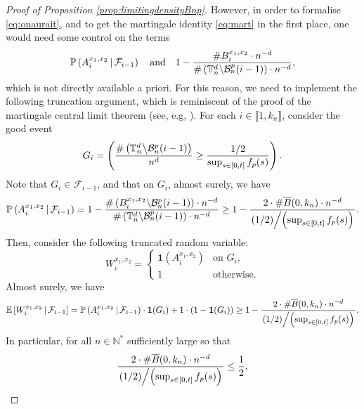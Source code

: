 \documentclass[a4paper,11pt]{article}
\begin{document}
\begin{proof}[Proof of Proposition \ref{prop:limitingdensityBnp}]
However, in order to formalise \eqref{eq:onaurait}, and to get the martingale identity \eqref{eq:mart} in the first place, one would need some control on the terms
\[\mathbb{P}\left(A_i^{x_1,x_2}\,\middle|\,\mathcal{F}_{i-1}\right)\quad\text{and}\quad1-\frac{\#B_i^{x_1,x_2}\cdot n^{-d}}{\#\left(\mathbb{T}_n^d\middle\backslash\mathcal{B}_n^p(i-1)\right)\cdot n^{-d}},\]
which is not directly available a priori.
For this reason, we need to implement the following truncation argument, which is reminiscent of the proof of the martingale central limit theorem (see, e.g, \cite[Chapter 15]{martingaleclt}).
For each $i\in\llbracket1,k_n\rrbracket$, consider the good event
\[G_i=\left(\frac{\#\left(\mathbb{T}_n^d\middle\backslash\mathcal{B}^p_n(i-1)\right)}{n^d}\geq\frac{1/2}{\sup_{s\in[0,t]}f_p(s)}\right).\]
Note that $G_i\in\mathcal{F}_{i-1}$, and that on $G_i$, almost surely, we have
\[\mathbb{P}\left(A_i^{x_1,x_2}\,\middle|\,\mathcal{F}_{i-1}\right)=1-\frac{\#\left(B_i^{x_1,x_2}\middle\backslash\mathcal{B}_n^p(i-1)\right)\cdot n^{-d}}{\#\left(\mathbb{T}_n^d\middle\backslash\mathcal{B}^p_n(i-1)\right)\cdot n^{-d}}\geq1-\frac{2\cdot\#\overline{B}(0,k_n)\cdot n^{-d}}{\left.(1/2)\middle/\left(\sup_{s\in[0,t]}f_p(s)\right)\right.}.\]
Then, consider the following truncated random variable:
\[W_i^{x_1,x_2}=\begin{cases}
\mathbf{1}\left(A_i^{x_1,x_2}\right)&\text{on $G_i$,}\\
1&\text{otherwise.}
\end{cases}\]
Almost surely, we have
\[\mathbb{E}\left[W_i^{x_1,x_2}\,\middle|\,\mathcal{F}_{i-1}\right]=\mathbb{P}\left(A_i^{x_1,x_2}\,\middle|\,\mathcal{F}_{i-1}\right)\cdot\mathbf{1}(G_i)+1\cdot(1-\mathbf{1}(G_i))\geq1-\frac{2\cdot\#\overline{B}(0,k_n)\cdot n^{-d}}{\left.(1/2)\middle/\left(\sup_{s\in[0,t]}f_p(s)\right)\right.}.\]
In particular, for all $n\in\mathbb{N}^*$ sufficiently large so that
\[\frac{2\cdot\#\overline{B}(0,k_n)\cdot n^{-d}}{\left.(1/2)\middle/\left(\sup_{s\in[0,t]}f_p(s)\right)\right.}\leq\frac{1}{2},\]

\end{proof}
\end{document}
